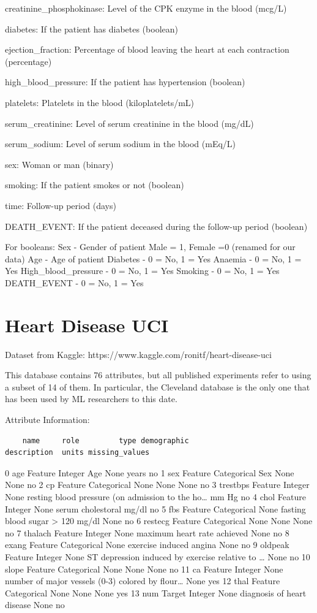 \documentclass[
  letterpaper,
]{krantz}
\begin{document}
creatinine\_phosphokinase: Level of the CPK enzyme in the blood (mcg/L)

diabetes: If the patient has diabetes (boolean)

ejection\_fraction: Percentage of blood leaving the heart at each
contraction (percentage)

high\_blood\_pressure: If the patient has hypertension (boolean)

platelets: Platelets in the blood (kiloplatelets/mL)

serum\_creatinine: Level of serum creatinine in the blood (mg/dL)

serum\_sodium: Level of serum sodium in the blood (mEq/L)

sex: Woman or man (binary)

smoking: If the patient smokes or not (boolean)

time: Follow-up period (days)

DEATH\_EVENT: If the patient deceased during the follow-up period
(boolean)

For booleans: Sex - Gender of patient Male = 1, Female =0 (renamed for
our data) Age - Age of patient Diabetes - 0 = No, 1 = Yes Anaemia - 0 =
No, 1 = Yes High\_blood\_pressure - 0 = No, 1 = Yes Smoking - 0 = No, 1
= Yes DEATH\_EVENT - 0 = No, 1 = Yes

\section{Heart Disease UCI}\label{sec-dd-heart-disease-uci}

Dataset from Kaggle: https://www.kaggle.com/ronitf/heart-disease-uci

This database contains 76 attributes, but all published experiments
refer to using a subset of 14 of them. In particular, the Cleveland
database is the only one that has been used by ML researchers to this
date.

Attribute Information:

\begin{verbatim}
    name     role         type demographic                                        description  units missing_values
\end{verbatim}

0 age Feature Integer Age None years no 1 sex Feature Categorical Sex
None None no 2 cp Feature Categorical None None None no 3 trestbps
Feature Integer None resting blood pressure (on admission to the
ho\ldots{} mm Hg no 4 chol Feature Integer None serum cholestoral mg/dl
no 5 fbs Feature Categorical None fasting blood sugar \textgreater{} 120
mg/dl None no 6 restecg Feature Categorical None None None no 7 thalach
Feature Integer None maximum heart rate achieved None no 8 exang Feature
Categorical None exercise induced angina None no 9 oldpeak Feature
Integer None ST depression induced by exercise relative to \ldots{} None
no 10 slope Feature Categorical None None None no 11 ca Feature Integer
None number of major vessels (0-3) colored by flour\ldots{} None yes 12
thal Feature Categorical None None None yes 13 num Target Integer None
diagnosis of heart disease None no
\end{document}
